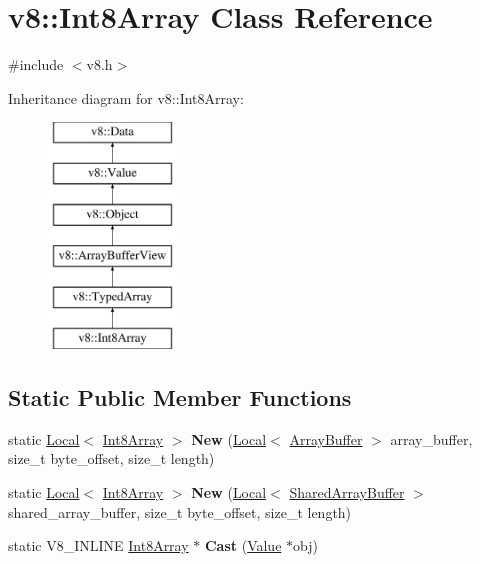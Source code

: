 \hypertarget{classv8_1_1Int8Array}{}\section{v8\+:\+:Int8\+Array Class Reference}
\label{classv8_1_1Int8Array}


{\ttfamily \#include $<$v8.\+h$>$}

Inheritance diagram for v8\+:\+:Int8\+Array\+:\begin{figure}[H]
\begin{center}
\leavevmode
\includegraphics[height=6.000000cm]{classv8_1_1Int8Array}
\end{center}
\end{figure}
\subsection*{Static Public Member Functions}
\begin{DoxyCompactItemize}
\item 
\hypertarget{classv8_1_1Int8Array_a13e12d1a556aa2ef92271484a10acd21}{}static \hyperlink{classv8_1_1Local}{Local}$<$ \hyperlink{classv8_1_1Int8Array}{Int8\+Array} $>$ {\bfseries New} (\hyperlink{classv8_1_1Local}{Local}$<$ \hyperlink{classv8_1_1ArrayBuffer}{Array\+Buffer} $>$ array\+\_\+buffer, size\+\_\+t byte\+\_\+offset, size\+\_\+t length)\label{classv8_1_1Int8Array_a13e12d1a556aa2ef92271484a10acd21}

\item 
\hypertarget{classv8_1_1Int8Array_a364d52f1dc634e637321b2a9f9ec4dd8}{}static \hyperlink{classv8_1_1Local}{Local}$<$ \hyperlink{classv8_1_1Int8Array}{Int8\+Array} $>$ {\bfseries New} (\hyperlink{classv8_1_1Local}{Local}$<$ \hyperlink{classv8_1_1SharedArrayBuffer}{Shared\+Array\+Buffer} $>$ shared\+\_\+array\+\_\+buffer, size\+\_\+t byte\+\_\+offset, size\+\_\+t length)\label{classv8_1_1Int8Array_a364d52f1dc634e637321b2a9f9ec4dd8}

\item 
\hypertarget{classv8_1_1Int8Array_a201a6b46e2cc455830d62c57bc8b4a3e}{}static V8\+\_\+\+I\+N\+L\+I\+N\+E \hyperlink{classv8_1_1Int8Array}{Int8\+Array} $\ast$ {\bfseries Cast} (\hyperlink{classv8_1_1Value}{Value} $\ast$obj)\label{classv8_1_1Int8Array_a201a6b46e2cc455830d62c57bc8b4a3e}

\end{DoxyCompactItemize}
